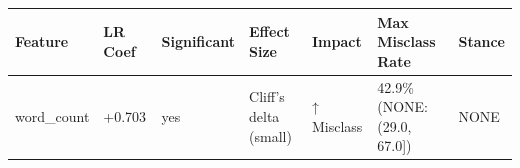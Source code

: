 \begin{tabular}{lllllll}
\toprule
Feature & LR Coef & Significant & Effect Size & Impact & Max Misclass Rate & Stance \\
\midrule
word\_count & +0.703 & yes & Cliff's delta (small) & ↑ Misclass & 42.9\% (NONE: (29.0, 67.0]) & NONE \\
\bottomrule
\end{tabular}
